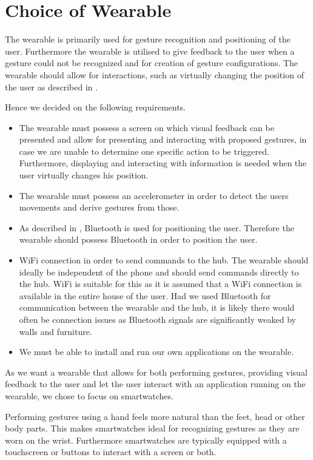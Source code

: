 \section{Choice of Wearable}
\label{sec:analysis:choice-of-wearables}

The wearable is primarily used for gesture recognition and positioning of the user. Furthermore the wearable is utilised to give feedback to the user when a gesture could not be recognized and for creation of gesture configurations. The wearable should allow for interactions, such as virtually changing the position of the user as described in .

Hence we decided on the following requirements.

\begin{itemize}
\item The wearable must possess a screen on which visual feedback can be presented and allow for presenting and interacting with proposed gestures, in case we are unable to determine one specific action to be triggered. Furthermore, displaying and interacting with information is needed when the user virtually changes his position.
\item The wearable must possess an accelerometer in order to detect the users movements and derive gestures from those.
\item As described in , Bluetooth is used for positioning the user. Therefore the wearable should possess Bluetooth in order to position the user.
\item WiFi connection in order to send commands to the hub. The wearable should ideally be independent of the phone and should send commands directly to the hub. WiFi is suitable for this as it is assumed that a WiFi connection is available in the entire house of the user. Had we used Bluetooth for communication between the wearable and the hub, it is likely there would often be connection issues as Bluetooth signals are significantly weaked by walls and furniture.
\item We must be able to install and run our own applications on the wearable.
\end{itemize}

As we want a wearable that allows for both performing gestures, providing visual feedback to the user and let the user interact with an application running on the wearable, we chose to focus on smartwatches.

Performing gestures using a hand feels more natural than the feet, head or other body parts. This makes smartwatches ideal for recognizing gestures as they are worn on the wrist. Furthermore smartwatches are typically equipped with a touchscreen or buttons to interact with a screen or both.

